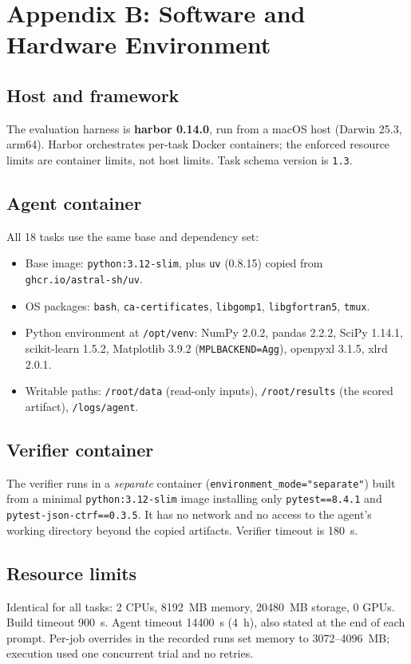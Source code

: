 \section{Appendix B: Software and Hardware Environment}
\label{app:environment}

\subsection{Host and framework}
The evaluation harness is \textbf{harbor 0.14.0}, run from a macOS host (Darwin 25.3, arm64). Harbor orchestrates per-task Docker containers; the enforced resource limits are container limits, not host limits. Task schema version is \texttt{1.3}.

\subsection{Agent container}
All 18 tasks use the same base and dependency set:
\begin{itemize}[leftmargin=1.4em,itemsep=1pt]
\item Base image: \texttt{python:3.12-slim}, plus \texttt{uv} (0.8.15) copied from \texttt{ghcr.io/astral-sh/uv}.
\item OS packages: \texttt{bash}, \texttt{ca-certificates}, \texttt{libgomp1}, \texttt{libgfortran5}, \texttt{tmux}.
\item Python environment at \texttt{/opt/venv}: NumPy 2.0.2, pandas 2.2.2, SciPy 1.14.1, scikit-learn 1.5.2, Matplotlib 3.9.2 (\texttt{MPLBACKEND=Agg}), openpyxl 3.1.5, xlrd 2.0.1.
\item Writable paths: \texttt{/root/data} (read-only inputs), \texttt{/root/results} (the scored artifact), \texttt{/logs/agent}.
\end{itemize}

\subsection{Verifier container}
The verifier runs in a \emph{separate} container (\texttt{environment\_mode="separate"}) built from a minimal \texttt{python:3.12-slim} image installing only \texttt{pytest==8.4.1} and \texttt{pytest-json-ctrf==0.3.5}. It has no network and no access to the agent's working directory beyond the copied artifacts. Verifier timeout is 180~s.

\subsection{Resource limits}
Identical for all tasks: 2 CPUs, 8192~MB memory, 20480~MB storage, 0 GPUs. Build timeout 900~s. Agent timeout 14400~s (4~h), also stated at the end of each prompt. Per-job overrides in the recorded runs set memory to 3072--4096~MB; execution used one concurrent trial and no retries.

